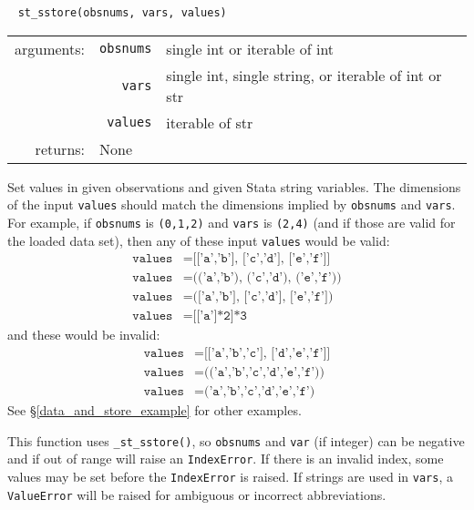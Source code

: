 \documentclass{article}
\begin{document}
			
			\ \newline
			\noindent \lstinline$st_sstore(obsnums, vars, values)$
								
			\vspace{1.5mm}
			\noindent 
			\indent \begin{tabular}{rrl}
					arguments: & \texttt{obsnums} & single int or iterable of int \\
						& \texttt{vars} & single int, single string, or iterable of int or str \\
						& \texttt{values} & iterable of str \\
					returns: & \multicolumn{2}{l}{None}
				\end{tabular}
								
			\vspace{1.5mm}
			\noindent Set values in given observations and given Stata string variables. The dimensions of the input \lstinline{values} should match the dimensions implied by \lstinline{obsnums} and \lstinline{vars}. For example, if \lstinline{obsnums} is \lstinline{(0,1,2)} and \lstinline{vars} is \lstinline{(2,4)} (and if those are valid for the loaded data set), then any of these input \lstinline{values} would be valid:
			\begin{align*}
				\texttt{values} &= \texttt{[['a','b'], ['c','d'], ['e','f']]} \\
				\texttt{values} &= \texttt{(('a','b'), ('c','d'), ('e','f'))} \\
				\texttt{values} &= \texttt{(['a','b'], ['c','d'], ['e','f'])} \\
				\texttt{values} &= \texttt{[['a']*2]*3}
			\end{align*}
			and these would be invalid:
			\begin{align*}
				\texttt{values} &= \texttt{[['a','b','c'], ['d','e','f']]} \\
				\texttt{values} &= \texttt{(('a','b','c','d','e','f'))} \\
				\texttt{values} &= \texttt{('a','b','c','d','e','f')}
			\end{align*}
See \S\ref{data_and_store_example} for other examples. 
			
			This function uses \lstinline{_st_sstore()}, so \lstinline{obsnums} and \lstinline{var} (if integer) can be negative and if out of range will raise an \lstinline{IndexError}. If there is an invalid index, some values may be set before the \lstinline{IndexError} is raised. If strings are used in \lstinline{vars}, a \lstinline{ValueError} will be raised for ambiguous or incorrect abbreviations. \newline
			
\end{document}
